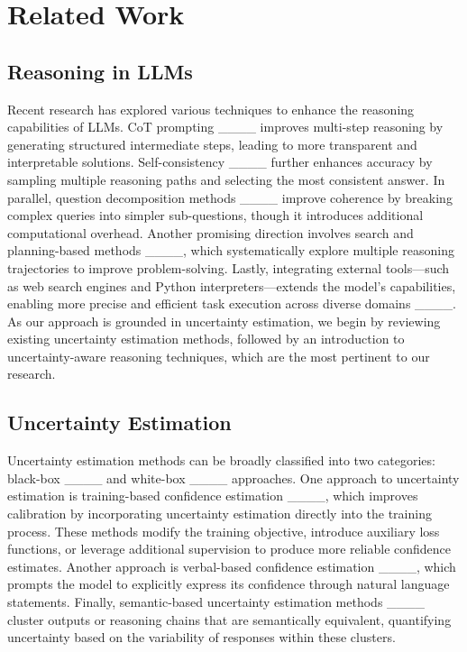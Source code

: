 \section{Related Work}
\subsection{Reasoning in LLMs}

Recent research has explored various techniques to enhance the reasoning capabilities of LLMs. CoT prompting ____ improves multi-step reasoning by generating structured intermediate steps, leading to more transparent and interpretable solutions. Self-consistency ____ further enhances accuracy by sampling multiple reasoning paths and selecting the most consistent answer. In parallel, question decomposition methods ____ improve coherence by breaking complex queries into simpler sub-questions, though it introduces additional computational overhead. Another promising direction involves search and planning-based methods ____, which systematically explore multiple reasoning trajectories to improve problem-solving. Lastly, integrating external tools—such as web search engines and Python interpreters—extends the model’s capabilities, enabling more precise and efficient task execution across diverse domains ____.
As our approach is grounded in uncertainty estimation, we begin by reviewing existing uncertainty estimation methods, followed by an introduction to uncertainty-aware reasoning techniques, which are the most pertinent to our research.

\subsection{Uncertainty Estimation}
Uncertainty estimation methods can be broadly classified into two categories: black-box ____ and white-box ____ approaches. One approach to uncertainty estimation is training-based confidence estimation ____, which improves calibration by incorporating uncertainty estimation directly into the training process. These methods modify the training objective, introduce auxiliary loss functions, or leverage additional supervision to produce more reliable confidence estimates. 
Another approach is verbal-based confidence estimation ____, which prompts the model to explicitly express its confidence through natural language statements. 
Finally, semantic-based uncertainty estimation methods ____ cluster outputs or reasoning chains that are semantically equivalent, quantifying uncertainty based on the variability of responses within these clusters.

